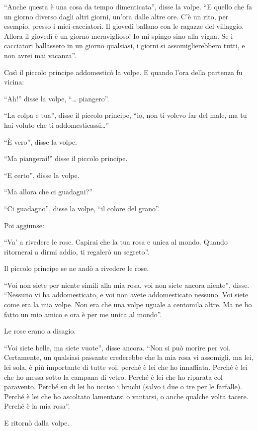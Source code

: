 \documentclass[11pt]{scrbook}
\begin{document}
``Anche questa è una cosa da tempo dimenticata'', disse la volpe. ``E quello che fa un giorno diverso dagli altri giorni, un'ora dalle altre ore. C'è un rito, per esempio, presso i miei cacciatori. Il giovedì ballano con le ragazze del villaggio. Allora il giovedì è un giorno meraviglioso! Io mi spingo sino alla vigna. Se i cacciatori ballassero in un giorno qualsiasi, i giorni si assomiglierebbero tutti, e non avrei mai vacanza''.

Così il piccolo principe addomesticò la volpe. E quando l'ora della partenza fu vicina:

``Ah!'' disse la volpe, ``\ldots{} piangero''.

``La colpa e tua'', disse il piccolo principe, ``io, non ti volevo far del male, ma tu hai voluto che ti addomesticassi\ldots{}''

``È vero'', disse la volpe.

``Ma piangerai!'' disse il piccolo principe.

``E certo'', disse la volpe.

``Ma allora che ci guadagni?''

``Ci guadagno'', disse la volpe, ``il colore del grano''.

Poi aggiunse:

``Va' a rivedere le rose. Capirai che la tua rosa e unica al mondo. Quando ritornerai a dirmi addio, ti regalerò un segreto''.

Il piccolo principe se ne andò a rivedere le rose.

``Voi non siete per niente simili alla mia rosa, voi non siete ancora niente'', disse. ``Nessuno vi ha addomesticato, e voi non avete addomesticato nessuno. Voi siete come era la mia volpe. Non era che una volpe uguale a centomila altre. Ma ne ho fatto un mio amico e ora è per me unica al mondo''.

Le rose erano a disagio.

``Voi siete belle, ma siete vuote'', disse ancora. ``Non si può morire per voi. Certamente, un qualsiasi passante crederebbe che la mia rosa vi assomigli, ma lei, lei sola, è più importante di tutte voi, perché è lei che ho innaffiata. Perché è lei che ho messa sotto la campana di vetro. Perché è lei che ho riparata col paravento. Perché su di lei ho ucciso i bruchi (salvo i due o tre per le farfalle). Perché è lei che ho ascoltato lamentarsi o vantarsi, o anche qualche volta tacere. Perché è la mia rosa''.

E ritornò dalla volpe.
\end{document}
